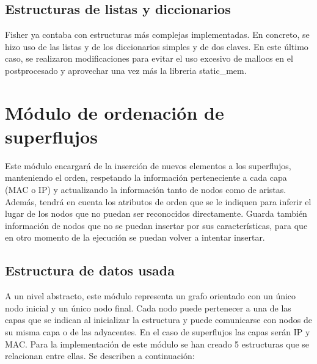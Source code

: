 \documentclass[twoside, 12pt]{epstfg}
\begin{document}
\subsection{Estructuras de listas y diccionarios}
Fisher ya contaba con estructuras más complejas implementadas. En concreto, se hizo uso de las listas y de los diccionarios simples y de dos claves. En este último caso, se realizaron modificaciones para evitar el uso excesivo de mallocs en el postprocesado y aprovechar una vez más la libreria static\_mem.

\section{Módulo de ordenación de superflujos}

Este módulo encargará de la inserción de nuevos elementos a los superflujos, manteniendo el orden, respetando la información perteneciente a cada capa (MAC o IP) y actualizando la información tanto de nodos como de aristas. Además, tendrá en cuenta los atributos de orden que se le indiquen para inferir el lugar de los nodos que no puedan ser reconocidos directamente. Guarda también información de nodos que no se puedan insertar por sus características, para que en otro momento de la ejecución se puedan volver a intentar insertar.

\subsection{Estructura de datos usada}
A un nivel abstracto, este módulo representa un grafo orientado con un único nodo inicial y un único nodo final. Cada nodo puede pertenecer a una de las capas que se indican al inicializar la estructura y puede comunicarse con nodos de su misma capa o de las adyacentes. En el caso de superflujos las capas serán IP y MAC. Para la implementación de este módulo se han creado 5 estructuras que se relacionan entre ellas. Se describen a continuación:
\end{document}
